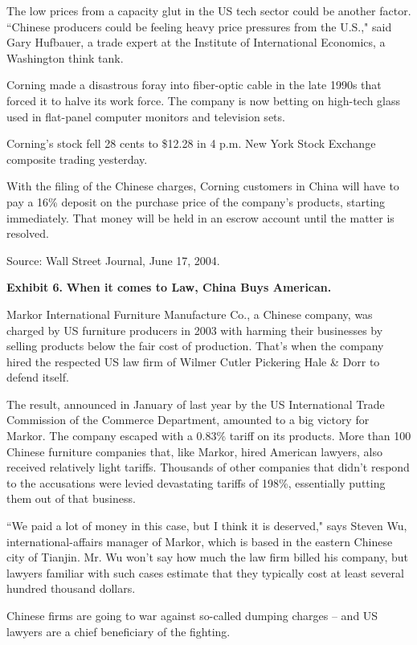 \documentclass[letterpaper,12pt]{article}
\begin{document}
The low prices from a capacity glut in the US tech sector could be another factor. ``Chinese producers could be feeling heavy price pressures from the U.S.," said Gary Hufbauer, a trade expert at the Institute of International Economics, a Washington think tank.

Corning made a disastrous foray into fiber-optic cable in the late 1990s that forced it to halve its work force. The company is now betting on high-tech glass used in flat-panel computer monitors and television sets.

Corning's stock fell 28 cents to \$12.28 in 4 p.m. New York Stock Exchange composite trading yesterday.

With the filing of the Chinese charges, Corning customers in China will have to pay a 16\% deposit on the purchase price of the company's products, starting immediately. That money will be held in an escrow account until the matter is resolved.

Source:  Wall Street Journal, June 17, 2004.  


\pagebreak%
{\bf Exhibit 6.} {\bf When it comes to Law, China Buys American.}  

Markor International Furniture Manufacture Co., a Chinese company, was charged by US furniture producers in 2003 with harming their businesses by selling products below the fair cost of production. That's when the company hired the respected US law firm of Wilmer Cutler Pickering Hale \& Dorr to defend itself.

The result, announced in January of last year by the US International Trade Commission of the Commerce Department, amounted to a big victory for Markor. The company escaped with a 0.83\% tariff on its products. More than 100 Chinese furniture companies that, like Markor, hired American lawyers, also received relatively light tariffs. Thousands of other companies that didn't respond to the accusations were levied devastating tariffs of 198\%, essentially putting them out of that business.

``We paid a lot of money in this case, but I think it is deserved," says Steven Wu, international-affairs manager of Markor, which is based in the eastern Chinese city of Tianjin. Mr. Wu won't say how much the law firm billed his company, but lawyers familiar with such cases estimate that they typically cost at least several hundred thousand dollars.

Chinese firms are going to war against so-called dumping charges -- and US  lawyers are a chief beneficiary of the fighting.
\end{document}
